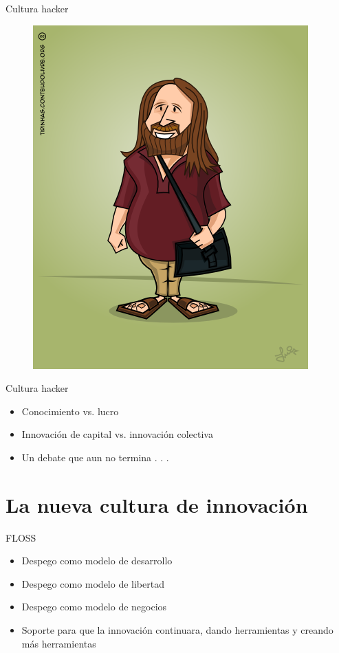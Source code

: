 \documentclass{beamer}
\begin{document}
\begin{frame}{Cultura hacker}
\begin{figure}[tbph]
\centering
\includegraphics[width=0.7\linewidth]{Figures/Richard_Stallman_Cartoon_by_pequeno3d}
\caption{}
\label{fig:Richard_Stallman_Cartoon_by_pequeno3d}
\end{figure}
\end{frame}

\begin{frame}{Cultura hacker}
\begin{itemize}
\item Conocimiento vs. lucro
\item Innovación de capital vs. innovación colectiva
\item Un debate que aun no termina . . .
\end{itemize}
\end{frame}


\section{La nueva cultura de innovación}


\begin{frame}{FLOSS}
\begin{itemize}
\item Despego como modelo de desarrollo
\item Despego como modelo de libertad
\item Despego como modelo de negocios
\item Soporte para que la innovación continuara, dando herramientas y creando más herramientas
\end{itemize}
\end{frame}
\end{document}
